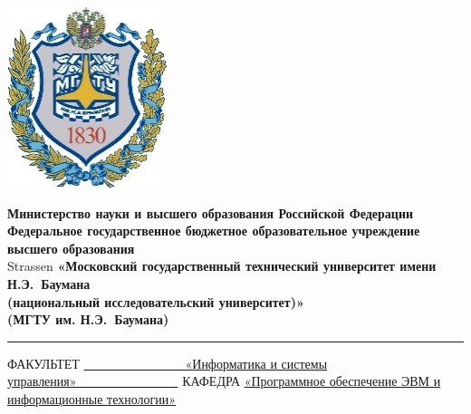 \documentclass[12pt]{report}
\begin{document}
\begin{titlepage}
	\fontsize{12pt}{12pt}\selectfont
	\noindent \begin{minipage}{0.15\textwidth}
		\includegraphics[width=\linewidth]{inc/img/b_logo.jpg}
	\end{minipage}
	\noindent\begin{minipage}{0.9\textwidth}\centering
		\textbf{Министерство науки и высшего образования Российской Федерации}\\
		\textbf{Федеральное государственное бюджетное образовательное учреждение высшего образования}\\Strassen
		\textbf{«Московский государственный технический университет имени Н.Э.~Баумана}\\
		\textbf{(национальный исследовательский университет)»}\\
		\textbf{(МГТУ им. Н.Э.~Баумана)}
	\end{minipage}
	
	\noindent\rule{15cm}{3pt}
	\newline\newline
	\noindent ФАКУЛЬТЕТ \underline{~~~~~~~~~~~~~~~~«Информатика и системы управления»~~~~~~~~~~~~~~~~} \newline\newline
	\noindent КАФЕДРА \underline{«Программное обеспечение ЭВМ и информационные технологии»}\newline\newline\newline\newline\newline\newline\newline
	

\end{titlepage}
\end{document}
